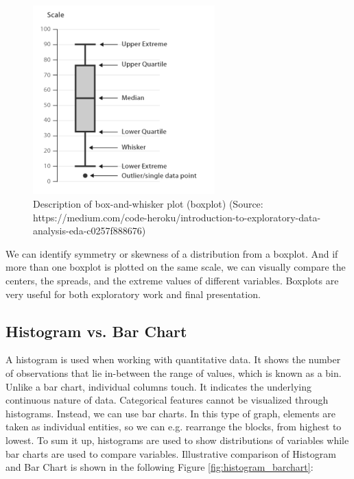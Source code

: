 \documentclass[a4paper,10pt,twoside]{article}
\begin{document}
\vspace{0.3cm}
\begin{figure}[hbt!]
\begin{center}
\includegraphics[width=7cm]{../pictures/boxplot.png}
\caption[Description of box-and-whisker plot (boxplot)]{Description of box-and-whisker plot (boxplot) (Source: https://medium.com/code-heroku/introduction-to-exploratory-data-analysis-eda-c0257f888676)}
\label{fig:boxplot}
\end{center}
\end{figure}

\noindent We can identify symmetry or skewness of a distribution from a boxplot. And if more than one boxplot is plotted on the same scale, we can visually compare the centers, the spreads, and the extreme values of different variables. Boxplots are very useful for both exploratory work and final presentation.

\subsection{Histogram vs. Bar Chart}

\noindent A histogram is used when working with quantitative data. It shows the number of observations that lie in-between the range of values, which is known as a bin. Unlike a bar chart, individual columns touch. It indicates the underlying continuous nature of data. Categorical features cannot be visualized through histograms. Instead, we can use bar charts. In this type of graph, elements are taken as individual entities, so we can e.g. rearrange the blocks, from highest to lowest. To sum it up, histograms are used to show distributions of variables while bar charts are used to compare variables. Illustrative comparison of Histogram and Bar Chart is shown in the following Figure \ref{fig:histogram_barchart}:
\end{document}
